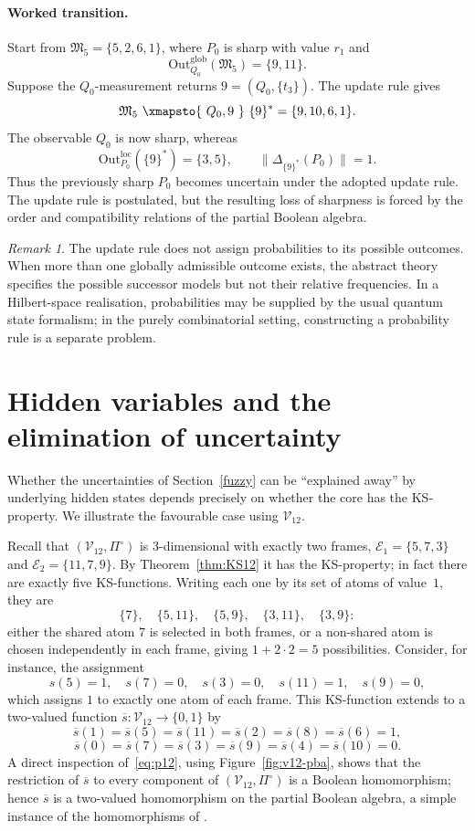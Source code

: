 \documentclass{article}   	%
\theoremstyle{plain}
\theoremstyle{definition}
\theoremstyle{remark}
\newtheorem{remark}[theorem]{Remark}
\newcommand{\Outloc}[2]{\mathrm{Out}^{\mathrm{loc}}_{#1}(#2)}
\newcommand{\Outglob}[2]{\mathrm{Out}^{\mathrm{glob}}_{#1}(#2)}
\begin{document}
\paragraph{Worked transition.}
Start from
$\mathfrak M_5=\{5,2,6,1\}$, where $P_0$ is sharp with value $r_1$ and
\[
\Outglob{{Q_0}}{\mathfrak M_5}=\{9,11\}.
\]
Suppose the $Q_0$-measurement returns $9=(Q_0,\{t_3\})$.  The update rule gives
\[
\mathfrak M_5\ \xmapsto{\ Q_0,9\ }\ \{9\}^*=\{9,10,6,1\}.
\]
The observable $Q_0$ is now sharp, whereas
\[
\Outloc{{P_0}}{\{9\}^*}=\{3,5\},
\qquad
\|\Delta_{\{9\}^*}(P_0)\|=1.
\]
Thus the previously sharp $P_0$ becomes uncertain under the adopted update rule.
The update rule is postulated, but the resulting loss of sharpness is forced by
the order and compatibility relations of the partial Boolean algebra.

\begin{remark}
\label{rem:nondet}
The update rule does not assign probabilities to its possible outcomes.  When
more than one globally admissible outcome exists, the abstract theory specifies
the possible successor models but not their relative frequencies.  In a
Hilbert-space realisation, probabilities may be supplied by the usual quantum
state formalism; in the purely combinatorial setting, constructing a probability
rule is a separate problem.
\end{remark}


\section{Hidden variables and the elimination of uncertainty}
\label{sec:hv}

Whether the uncertainties of Section~\ref{fuzzy} can be ``explained away'' by
underlying hidden states depends precisely on whether the core has the
KS-property.
We illustrate the favourable case using $\mathcal V_{12}$.

Recall that $(\mathcal V_{12},\Pi^\circ)$ is $3$-dimensional with exactly two
frames, $\mathcal E_1=\{5,7,3\}$ and $\mathcal E_2=\{11,7,9\}$.
By Theorem~\ref{thm:KS12} it has the KS-property; in fact there are exactly five
KS-functions.  Writing each one by its set of atoms of value~$1$, they are
\[
\{7\},\quad\{5,11\},\quad\{5,9\},\quad\{3,11\},\quad\{3,9\}:
\]
either the shared atom $7$ is selected in both frames, or a non-shared atom is
chosen independently in each frame, giving $1+2\cdot2=5$ possibilities.
Consider, for instance, the assignment
\[
s(5)=1,\quad s(7)=0,\quad s(3)=0,\quad s(11)=1,\quad s(9)=0,
\]
which assigns $1$ to exactly one atom of each frame.
This KS-function extends to a two-valued function
$\overline s:\mathcal V_{12}\to\{0,1\}$ by
\[
\overline s(1)=\overline s(5)=\overline s(11)=\overline s(2)
=\overline s(8)=\overline s(6)=1,
\]
\[
\overline s(0)=\overline s(7)=\overline s(3)=\overline s(9)
=\overline s(4)=\overline s(10)=0 .
\]
A direct inspection of~\eqref{eq:p12}, using Figure~\ref{fig:v12-pba}, shows that the
restriction of $\overline s$ to every component of $(\mathcal V_{12},\Pi^\circ)$
is a Boolean homomorphism; hence $\overline s$ is a two-valued homomorphism on the
partial Boolean algebra, a simple instance of the homomorphisms of \cite{KS}.
\end{document}
